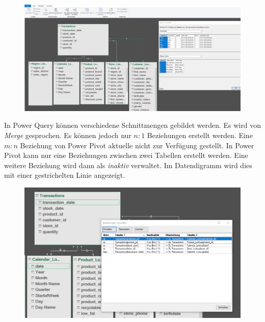 \begin{figure}[H]
	\centering
	\includegraphics[scale = 0.3]{attachment/chapter_1/screenshot057}
	\caption{}
	\label{fig:screenshot057}
\end{figure}
In Power Query können verschiedene Schnittmengen gebildet werden. Es wird von \textit{Merge} gesprochen. Es können jedoch nur $n:1$ Beziehungen erstellt werden. Eine $m:n$ Beziehung von Power Pivot aktuelle nicht zur Verfügung gestellt. In Power Pivot kann nur eine Beziehungen zwischen zwei Tabellen erstellt werden. Eine weitere Beziehung wird dann als \textit{inaktiv} verwaltet. Im Datendigramm wird dies mit einer gestrichelten Linie angezeigt.
\begin{figure}[H]
 	\centering
	\includegraphics[scale = 0.3]{attachment/chapter_1/screenshot058}
	\caption{}
	\label{fig:screenshot058}
\end{figure}
